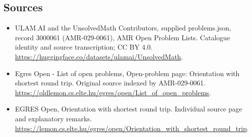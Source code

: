 \documentclass[11pt,a4paper]{article}
\begin{document}
\subsection{Sources}
\begin{itemize}
\item[S1] ULAM.AI and the UnsolvedMath Contributors, supplied problems.json, record 3000061 (AMR-029-0061), AMR Open Problem Lists. Catalogue identity and source transcription; CC BY 4.0.
\url{https://huggingface.co/datasets/ulamai/UnsolvedMath}.
\item[S2] Egres Open - List of open problems, Open-problem page: Orientation with shortest round trip. Original source indexed by AMR-029-0061.
\url{https://oldlemon.cs.elte.hu/egres/open/List_of_open_problems}.
\item[S3] EGRES Open, Orientation with shortest round trip. Individual source page and explanatory remarks.
\url{https://lemon.cs.elte.hu/egres/open/Orientation_with_shortest_round_trip}.
\end{itemize}
\end{document}
